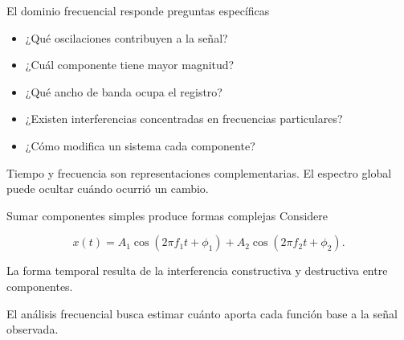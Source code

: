 \documentclass[
  ignorenonframetext,
  aspectratio=169,
  spanish,
  professionalfonts]{beamer}
\providecommand{\tightlist}{%
  \setlength{\itemsep}{0pt}\setlength{\parskip}{0pt}}
\begin{document}
\begin{frame}{El dominio frecuencial responde preguntas específicas}
\protect{}\label{el-dominio-frecuencial-responde-preguntas-especuxedficas}
\begin{itemize}
\tightlist
\item
  ¿Qué oscilaciones contribuyen a la señal?
\item
  ¿Cuál componente tiene mayor magnitud?
\item
  ¿Qué ancho de banda ocupa el registro?
\item
  ¿Existen interferencias concentradas en frecuencias particulares?
\item
  ¿Cómo modifica un sistema cada componente?
\end{itemize}

\begin{tcolorbox}[enhanced jigsaw, arc=.35mm, bottomrule=.15mm, bottomtitle=1mm, breakable, colback=white, colbacktitle=quarto-callout-warning-color!10!white, colframe=quarto-callout-warning-color-frame, coltitle=black, left=2mm, leftrule=.75mm, opacityback=0, opacitybacktitle=0.6, rightrule=.15mm, title={No es una vista superior}, titlerule=0mm, toprule=.15mm, toptitle=1mm]

Tiempo y frecuencia son representaciones complementarias. El espectro
global puede ocultar cuándo ocurrió un cambio.

\end{tcolorbox}
\end{frame}

\begin{frame}{Sumar componentes simples produce formas complejas}
\protect{}\label{sumar-componentes-simples-produce-formas-complejas}
Considere

\[
x(t)=A_1\cos(2\pi f_1t+\phi_1)
+A_2\cos(2\pi f_2t+\phi_2).
\]

La forma temporal resulta de la interferencia constructiva y destructiva
entre componentes.

\begin{tcolorbox}[enhanced jigsaw, arc=.35mm, bottomrule=.15mm, bottomtitle=1mm, breakable, colback=white, colbacktitle=quarto-callout-note-color!10!white, colframe=quarto-callout-note-color-frame, coltitle=black, left=2mm, leftrule=.75mm, opacityback=0, opacitybacktitle=0.6, rightrule=.15mm, title={Interpretación}, titlerule=0mm, toprule=.15mm, toptitle=1mm]

El análisis frecuencial busca estimar cuánto aporta cada función base a
la señal observada.

\end{tcolorbox}
\end{frame}
\end{document}
